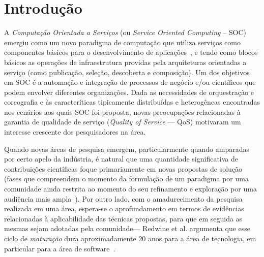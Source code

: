 
\section{Introdu\c{c}\~{a}o}\label{sec:introduction}

A \emph{Computa\c c\~{a}o Orientada a Servi\c cos} (ou \emph{Service Oriented Computing} -- SOC) emergiu como 
um novo paradigma de computa\c c\~{a}o que utiliza servi\c cos como componentes b\'{a}sicos para o desenvolvimento 
de aplica\c c\~{o}es~\cite{papazoglou:cacm2003}, e tendo como blocos b\'{a}sicos as opera\c c\~{o}es de infraestrutura providas 
pela arquiteturas orientadas a servi\c co (como publica\c c\~{a}o, sele\c c\~{a}o, descoberta e composi\c c\~{a}o).  
Um dos objetivos em SOC \'{e} a automa\c c\~{a}o e integra\c c\~{a}o de processos de neg\'{o}cio e/ou cient\'{i}ficos que podem envolver 
diferentes organiza\c c\~{o}es. Dada as necessidades de orquestra\c c\~{a}o e coreografia e \`{a}s  caracter\'{i}ticas tipicamente distribu\'{i}das e heterog\^{e}neas encontradas 
nos cen\'{a}rios aos quais SOC foi proposta, novas preocupa\c c\~{o}es relacionadas \`{a} garantia de qualidade de 
servi\c co (\emph{Quality of Service} --- QoS) motivaram um interesse crescente dos 
pesquisadores na \'{a}rea. 

Quando novas \'{a}reas de pesquisa emergem, particularmente quando amparadas por 
certo apelo da ind\'{u}stria, \'{e} natural que uma quantidade significativa de 
contribui\c c\~{o}es cient\'{i}ficas foque primariamente em novas propostas de solu\c c\~{a}o 
(fases que compreendem o momento da formula\c c\~{a}o de um paradigma por uma comunidade ainda restrita 
ao momento do seu refinamento e explora\c c\~{a}o por uma audi\^{e}ncia mais ampla~\cite{redwine:icse1985}).   
Por outro lado, com o amadurecimento da pesquisa realizada em uma \'{a}rea, espera-se o aprofundamento 
em termos de evid\^{e}ncias relacionadas \`{a} aplicabilidade das t\'{e}cnicas propostas, para que em seguida as mesmas 
sejam adotadas pela comunidade--- Redwine et al. argumenta que 
esse ciclo de \emph{matura\c c\~{a}o} dura aproximadamente 20 anos para a \'{a}rea de tecnologia, em 
particular para a \'{a}rea de software~\cite{redwine:icse1985}.

